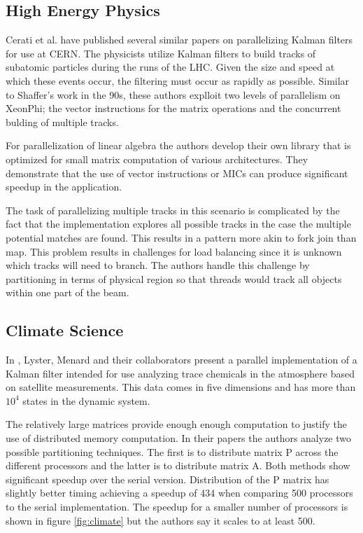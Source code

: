 \documentclass[11pt]{article}
\begin{document}
\subsection{High Energy Physics}
Cerati et al. have published several similar papers \cite{cerati2015kalman,cerati2016kalman,cerati2015traditional} on parallelizing Kalman filters for use at CERN. The physicists utilize Kalman filters to build tracks of subatomic particles during the runs of the LHC. Given the size and speed at which these events occur, the filtering must occur as rapidly as possible. Similar to Shaffer's work in the 90s, these authors explloit two levels of parallelism on XeonPhi; the vector instructions for the matrix operations and the concurrent bulding of multiple tracks.

For parallelization of linear algebra the authors develop their own library that is optimized for small matrix computation of various architectures. They demonstrate that the use of vector instructions or MICs can produce significant speedup in the application.

The task of parallelizing multiple tracks in this scenario is complicated by the fact that the implementation explores all possible tracks in the case the multiple potential matches are found. This results in a pattern more akin to fork join than map. This problem results in challenges for load balancing since it is unknown which tracks will need to branch. The authors handle this challenge by partitioning in terms of physical region so that threads would track all objects within one part of the beam.


\subsection{Climate Science}
In \cite{menard2000assimilation1,menard2000assimilation2,lyster1997parallel}, Lyster, Menard and their collaborators present a parallel implementation of a Kalman filter intended for use analyzing trace chemicals in the atmosphere based on satellite measurements. This data comes in five dimensions and has more than $10^4$ states in the dynamic system. 

The relatively large matrices provide enough enough computation to justify the use of distributed memory computation. In their papers the authors analyze two possible partitioning techniques. The first is to distribute matrix P across the different processors and the latter is to distribute matrix A. Both methods show significant speedup over the serial version. Distribution of the P matrix has slightly better timing achieving a speedup of 434 when comparing 500 processors to the serial implementation. The speedup for a smaller number of processors is shown in figure \ref{fig:climate} but the authors say it scales to at least 500.
\end{document}
